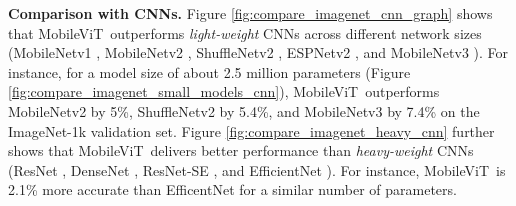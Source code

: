 \documentclass[preprint]{article} \usepackage{iclr2022_conference,times}
\newcommand{\arch}{MobileViT}
\begin{document}
\vspace{-4mm}
\textbf{Comparison with CNNs.} Figure \ref{fig:compare_imagenet_cnn_graph} shows that \arch~outperforms \emph{light-weight} CNNs across different network sizes (MobileNetv1 \citep{howard2017mobilenets}, MobileNetv2 \citep{sandler2018mobilenetv2}, ShuffleNetv2 \citep{ma2018shufflenet}, ESPNetv2 \citep{mehta2019espnetv2}, and MobileNetv3 \citep{howard2019searching}). For instance, for a model size of about 2.5 million parameters (Figure \ref{fig:compare_imagenet_small_models_cnn}), \arch~outperforms MobileNetv2 by 5\%, ShuffleNetv2 by 5.4\%, and MobileNetv3 by 7.4\% on the ImageNet-1k validation set. Figure \ref{fig:compare_imagenet_heavy_cnn} further shows that \arch~delivers better performance than  \emph{heavy-weight} CNNs (ResNet \citep{he2016deep}, DenseNet \citep{huang2017densely}, ResNet-SE \citep{hu2018squeeze}, and EfficientNet \citep{tan2019efficientnet}). For instance, \arch~is 2.1\% more accurate than EfficentNet for a similar number of parameters.
\end{document}
